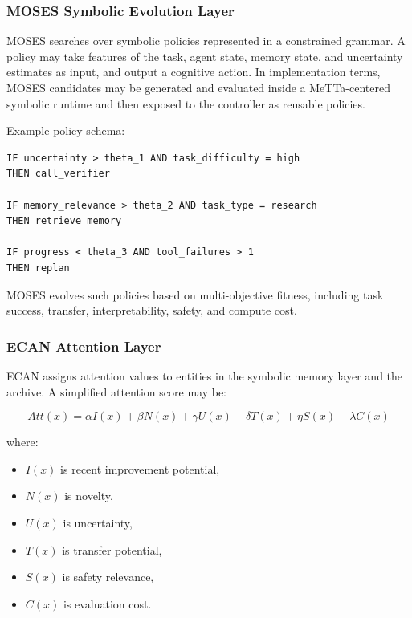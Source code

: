 \documentclass[11pt]{article}
\begin{document}
\subsubsection{MOSES Symbolic Evolution Layer}

MOSES searches over symbolic policies represented in a constrained grammar. A policy may take features of the task, agent state, memory state, and uncertainty estimates as input, and output a cognitive action. In implementation terms, MOSES candidates may be generated and evaluated inside a MeTTa-centered symbolic runtime and then exposed to the controller as reusable policies.

Example policy schema:

\begin{verbatim}
IF uncertainty > theta_1 AND task_difficulty = high
THEN call_verifier

IF memory_relevance > theta_2 AND task_type = research
THEN retrieve_memory

IF progress < theta_3 AND tool_failures > 1
THEN replan
\end{verbatim}

MOSES evolves such policies based on multi-objective fitness, including task success, transfer, interpretability, safety, and compute cost.

\subsubsection{ECAN Attention Layer}

ECAN assigns attention values to entities in the symbolic memory layer and the archive. A simplified attention score may be:

\begin{equation}
Att(x) =
\alpha I(x) +
\beta N(x) +
\gamma U(x) +
\delta T(x) +
\eta S(x) -
\lambda C(x)
\end{equation}

where:

\begin{itemize}[leftmargin=*]
    \item $I(x)$ is recent improvement potential,
    \item $N(x)$ is novelty,
    \item $U(x)$ is uncertainty,
    \item $T(x)$ is transfer potential,
    \item $S(x)$ is safety relevance,
    \item $C(x)$ is evaluation cost.
\end{itemize}
\end{document}
